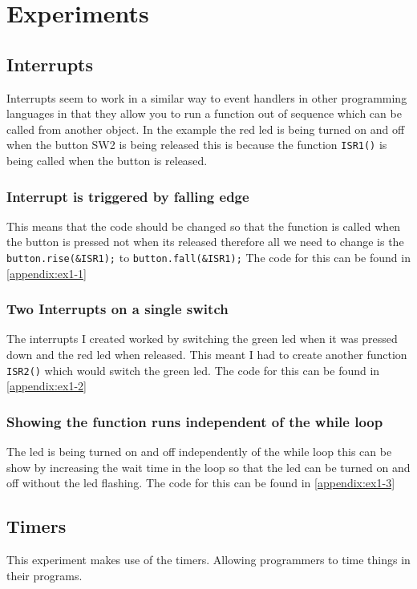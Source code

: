 \documentclass[a4paper,12pt]{scrartcl}
\begin{document}
	\section{Experiments}
	{
		\subsection{Interrupts}
		{
			Interrupts seem to work in a similar way to event handlers in other programming languages in that they allow you to run a function out of sequence which can be called from another object. In the example the red led is being turned on and off when the button SW2 is being released this is because the function \lstinline|ISR1()| is being called when the button is released.
			\subsubsection{Interrupt is triggered by falling edge}
			{
				This means that the code should be changed so that the function is called when the button is pressed not when its released therefore all we need to change is the \lstinline|button.rise(&ISR1);| to \lstinline|button.fall(&ISR1);| The code for this can be found in \cref{appendix:ex1-1}
			}
			\subsubsection{Two Interrupts on a single switch}
			{
				The interrupts I created worked by switching the green led when it was pressed down and the red led when released. This meant I had to create another function \lstinline|ISR2()| which would switch the green led. The code for this can be found in \cref{appendix:ex1-2}
			}
			
			\subsubsection{Showing the function runs independent of the while loop}
			{
				The led is being turned on and off independently of the while loop this can be show by increasing the wait time in the loop so that the led can be turned on and off without the led flashing. The code for this can be found in \cref{appendix:ex1-3}
			}
		}
		\subsection{Timers}
		{
			This experiment makes use of the timers. Allowing programmers to time things in their programs.
}}
\end{document}
